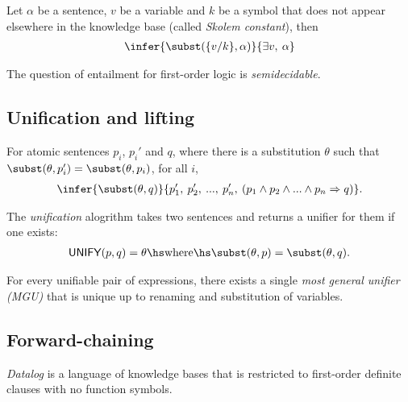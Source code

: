 \documentclass{article}
\begin{document}
\begin{theorem}
    Let $\alpha$ be a sentence, $v$ be a variable and $k$ be a
    symbol that does not appear elsewhere in the knowledge base
    (called \emph{Skolem constant}), then 
    \begin{align*}
        \infer{\subst(\{v/k\},\alpha)}{\exists v,\:\alpha}
    \end{align*} 
\end{theorem}

\begin{theorem}
    The question of entailment for first-order logic is \emph{semidecidable}.
\end{theorem} 

\subsection{Unification and lifting}

\begin{theorem}
    For atomic sentences $p_i$, $p_i'$ and $q$, where there is a substitution
    $\theta$ such that $\subst(\theta,p_i')=\subst(\theta,p_i)$, for
    all $i$,
    \begin{align*}
        \infer{\subst(\theta,q)}{p_1',\: p_2',\: ...,\: p_n',\:(p_1\wedge p_2 \wedge ... \wedge p_n\Rightarrow q)}.
    \end{align*}
\end{theorem}

\begin{definition}
    The \emph{unification} alogrithm takes two sentences and returns a unifier
    for them if one exists:
    \begin{align*}
        \textsf{UNIFY}(p,q)=\theta \hs\text{where}\hs \subst(\theta,p)=\subst(\theta,q).
    \end{align*}
\end{definition}

\begin{theorem}
    For every unifiable pair of expressions, there exists a single \emph{most general
    unifier (MGU)} that is unique up to renaming and substitution of variables.
\end{theorem}

\subsection{Forward-chaining}

\begin{definition}
    \emph{Datalog} is a language of knowledge bases that is restricted to first-order
    definite clauses with no function symbols.
\end{definition}
\end{document}
